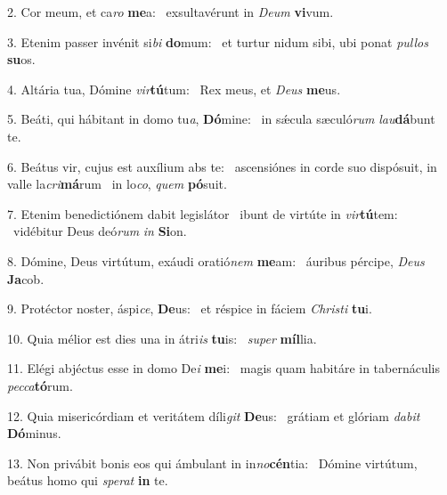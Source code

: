 2. Cor meum, et ca\textit{ro} \textbf{me}a: \ast\  exsultavérunt in \textit{De}\textit{um} \textbf{vi}vum.\

3. Etenim passer invénit si\textit{bi} \textbf{do}mum: \ast\  et turtur nidum sibi, ubi ponat \textit{pul}\textit{los} \textbf{su}os.\

4. Altária tua, Dómine \textit{vir}\textbf{tú}tum: \ast\  Rex meus, et \textit{De}\textit{us} \textbf{me}us.\

5. Beáti, qui hábitant in domo tu\textit{a}, \textbf{Dó}mine: \ast\  in sǽcula sæculó\textit{rum} \textit{lau}\textbf{dá}bunt te.\

6. Beátus vir, cujus est auxílium abs te: \dag\  ascensiónes in corde suo dispósuit, in valle la\textit{cri}\textbf{má}rum \ast\  in lo\textit{co}, \textit{quem} \textbf{pó}suit.\

7. Etenim benedictiónem dabit legislátor \dag\  ibunt de virtúte in \textit{vir}\textbf{tú}tem: \ast\  vidébitur Deus deó\textit{rum} \textit{in} \textbf{Si}on.\

8. Dómine, Deus virtútum, exáudi oratió\textit{nem} \textbf{me}am: \ast\  áuribus pércipe, \textit{De}\textit{us} \textbf{Ja}cob.\

9. Protéctor noster, áspi\textit{ce}, \textbf{De}us: \ast\  et réspice in fáciem \textit{Chris}\textit{ti} \textbf{tu}i.\

10. Quia mélior est dies una in átri\textit{is} \textbf{tu}is: \ast\  \textit{su}\textit{per} \textbf{míl}lia.\

11. Elégi abjéctus esse in domo De\textit{i} \textbf{me}i: \ast\  magis quam habitáre in tabernáculis \textit{pec}\textit{ca}\textbf{tó}rum.\

12. Quia misericórdiam et veritátem díli\textit{git} \textbf{De}us: \ast\  grátiam et glóriam \textit{da}\textit{bit} \textbf{Dó}minus.\

13. Non privábit bonis eos qui ámbulant in in\textit{no}\textbf{cén}tia: \ast\  Dómine virtútum, beátus homo qui \textit{spe}\textit{rat} \textbf{in} te.\

